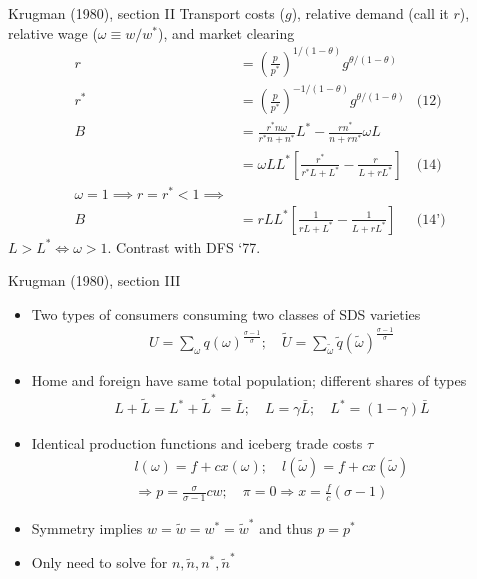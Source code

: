 \documentclass[10pt,notes=hide]{beamer}
\begin{document}
\begin{frame}{Krugman (1980), section II}
Transport costs ($g$), relative demand (call it $r$), relative wage ($\omega \equiv w / w^{*}$), and market clearing
\begin{align*}
r
&=
\left(\frac{p}{p^{*}}\right)^{1/(1-\theta)}g^{\theta/(1-\theta)}
\\
r^{*}
&=
\left(\frac{p}{p^{*}}\right)^{-1/(1-\theta)}g^{\theta/(1-\theta)}
&
\text{(12)}
\\
B
&=
\frac{r^{*}n\omega}{r^{*}n+n^{*}}L^{*}
-
\frac{r n^{*}}{n+r n^{*}}\omega L
\\
&=
\omega L L^{*} \left[\frac{r^{*}}{r^{*} L + L^{*}} - \frac{r}{L + r L^{*}}\right]
&
\text{(14)}
\\
\omega = 1 \implies r = r^{*} < 1 \implies
\\
B
&=
r L L^{*} \left[\frac{1}{r L + L^{*}} - \frac{1}{L + r L^{*}}\right]
&
\text{(14')}
\end{align*}
$L>L^{*} \iff \omega > 1$. Contrast with DFS `77.
\end{frame}
\begin{frame}{Krugman (1980), section III}
\begin{itemize}
	\item Two types of consumers consuming two classes of SDS varieties
	\begin{align*}U = \sum_{\omega} q(\omega)^{\frac{\sigma-1}{\sigma}} ; \quad \tilde{U} = \sum_{\tilde{\omega}} \tilde{q}(\tilde{\omega})^{\frac{\sigma-1}{\sigma}} \end{align*}
	\item Home and foreign have same total population; different shares of types
	\begin{align*}L + \tilde{L} = L^* + \tilde{L}^{*} = \bar{L} ; \quad L = \gamma \bar{L} ; \quad L^* = (1-\gamma)\bar{L}  \end{align*}
	\item Identical production functions and iceberg trade costs $\tau$
	\begin{align*} l(\omega) = f + c x(\omega) ; \quad l(\tilde{\omega}) = f + c x(\tilde{\omega}) \\
	\Rightarrow p = \frac{\sigma}{\sigma-1} c w ; \quad \pi=0\Rightarrow x = \frac{f}{c}\left(\sigma-1\right)
	\end{align*}
	\item Symmetry implies $w = \tilde{w} = w^* = \tilde{w}^*$ and thus $p=p^*$
	\item Only need to solve for $n, \tilde{n}, n^*, \tilde{n}^{*}$
\end{itemize}
\end{frame}
\end{document}
